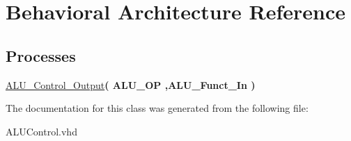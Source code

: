 \hypertarget{class_a_l_u___control_1_1_behavioral}{\section{\-Behavioral \-Architecture \-Reference}
\label{class_a_l_u___control_1_1_behavioral}
}
\*
\*
\subsection*{\-Processes}
 \begin{DoxyCompactItemize}
\item 
\hypertarget{class_a_l_u___control_1_1_behavioral_a86f70441267014ffedcb802b679dd560}{\hyperlink{class_a_l_u___control_1_1_behavioral_a86f70441267014ffedcb802b679dd560}{\-A\-L\-U\-\_\-\-Control\-\_\-\-Output}{\bfseries  ( {\bfseries \-A\-L\-U\-\_\-\-O\-P  ,\-A\-L\-U\-\_\-\-Funct\-\_\-\-In } )}}\label{class_a_l_u___control_1_1_behavioral_a86f70441267014ffedcb802b679dd560}

\end{DoxyCompactItemize}


\-The documentation for this class was generated from the following file\-:\begin{DoxyCompactItemize}
\item 
\-A\-L\-U\-Control.\-vhd\end{DoxyCompactItemize}
